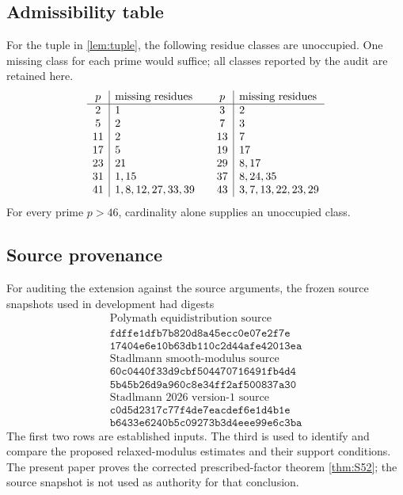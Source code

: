 \subsection{Admissibility table}

For the tuple in \cref{lem:tuple}, the following residue classes are
unoccupied.  One missing class for each prime would suffice; all classes
reported by the audit are retained here.
\[
\begin{array}{c|l@{\qquad}c|l}
p&\text{missing residues}&p&\text{missing residues}\\
\hline
2&1&3&2\\
5&2&7&3\\
11&2&13&7\\
17&5&19&17\\
23&21&29&8,17\\
31&1,15&37&8,24,35\\
41&1,8,12,27,33,39&
43&3,7,13,22,23,29
\end{array}
\]
For every prime \(p>46\), cardinality alone supplies an unoccupied class.

\subsection{Source provenance}

For auditing the extension against the source arguments, the frozen source
snapshots used in development had digests
\[
\begin{array}{c}
\text{Polymath equidistribution source}\\
\mathtt{fdffe1dfb7b820d8a45ecc0e07e2f7e}\\
\mathtt{17404e6e10b63db110c2d44afe42013ea}\\[3pt]
\text{Stadlmann smooth-modulus source}\\
\mathtt{60c0440f33d9cbf504470716491fb4d4}\\
\mathtt{5b45b26d9a960c8e34ff2af500837a30}\\[3pt]
\text{Stadlmann 2026 version-1 source}\\
\mathtt{c0d5d2317c77f4de7eacdef6e1d4b1e}\\
\mathtt{b6433e6240b5c09273b3d4eee99e6c3ba}
\end{array}
\]
The first two rows are established inputs.  The third is used to identify and
compare the proposed relaxed-modulus estimates and their support conditions.
The present paper proves the corrected prescribed-factor theorem
\cref{thm:S52}; the source snapshot is not used as authority for that
conclusion.
